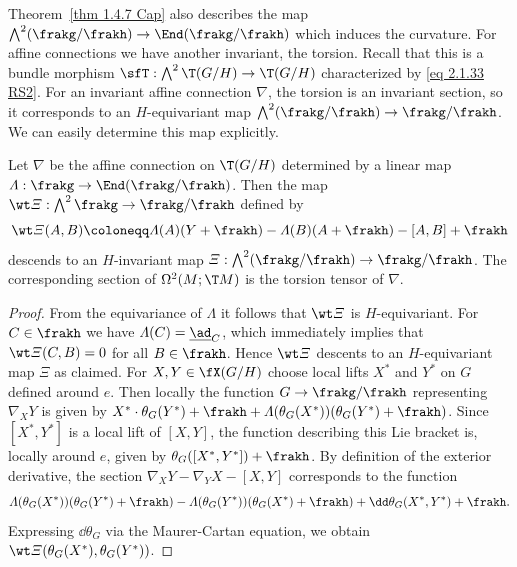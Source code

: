 Theorem~\ref{thm 1.4.7 Cap} also describes the map $\bigwedge^2(\frakg\slash\frakh)\to \End(\frakg\slash\frakh)$ which induces the curvature. For affine connections we have another invariant, the torsion. Recall that this is a bundle morphism $\sfT:\bigwedge^2 \T(G\slash H)\to \T(G\slash H)$ characterized by \eqref{eq 2.1.33 RS2}. For an invariant affine connection $\nabla$, the torsion is an invariant section, so it corresponds to an $H$-equivariant map $\bigwedge^2(\frakg\slash\frakh)\to \frakg\slash\frakh$. We can easily determine this map explicitly.

\begin{prop}\label{prop 1.4.8 Cap}
    Let $\nabla$ be the affine connection on $\T(G\slash H)$ determined by a linear map $\varLambda:\frakg\to\End(\frakg\slash\frakh)$. Then the map $\wt\varXi:\bigwedge^2\frakg\to \frakg\slash\frakh$ defined by 
    \[\wt\varXi(A,B)\coloneqq \varLambda(A)(Y+\frakh)-\varLambda(B)(A+\frakh)-[A,B]+\frakh\]
    descends to an $H$-invariant map $\varXi:\bigwedge^2(\frakg\slash\frakh)\to \frakg\slash\frakh$. The corresponding section of $\Omega^2(M;\T M)$ is the torsion tensor of $\nabla$.
\end{prop}
\begin{proof}
    From the equivariance of $\varLambda$ it follows that $\wt\varXi$ is $H$-equivariant. For $C\in\frakh$ we have $\varLambda(C)=\underline{\ad}_C$, which immediately implies that $\wt\varXi(C,B)=0$ for all $B\in\frakh$. Hence $\wt\varXi$ descents to an $H$-equivariant map $\varXi$ as claimed. For $X,Y\in\fX(G\slash H)$ choose local lifts $X^\ast$ and $Y^\ast$ on $G$ defined around $e$. Then locally the function $G\to \frakg\slash\frakh$ representing $\nabla_X Y$ is given by $X^\ast\cdot\theta_G(Y^\ast)+\frakh+\varLambda(\theta_G(X^\ast))(\theta_G(Y^\ast)+\frakh)$. Since $[X^\ast,Y^\ast]$ is a local lift of $[X,Y]$, the function describing this Lie bracket is, locally around $e$, given by $\theta_G([X^\ast,Y^\ast])+\frakh$. By definition of the exterior derivative, the section $\nabla_X Y-\nabla_Y X-[X,Y]$ corresponds to the function 
    \[\varLambda(\theta_G(X^\ast))(\theta_G(Y^\ast)+\frakh)-\varLambda(\theta_G(Y^\ast))(\theta_G(X^\ast)+\frakh)+\dd\theta_G(X^\ast,Y^\ast)+\frakh.\]
    Expressing $\dd\theta_G$ via the Maurer-Cartan equation, we obtain $\wt\varXi(\theta_G(X^\ast),\theta_G(Y^\ast))$.
\end{proof}

